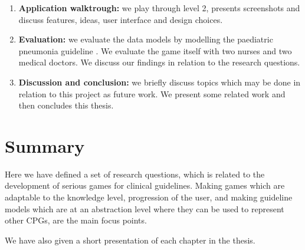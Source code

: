\begin{enumerate}
	\item \textbf{Application walktrough:} we play through level 2, presents screenshots and discuss features, ideas, user interface and design choices.
	\item \textbf{Evaluation:} we evaluate the data models by modelling the paediatric pneumonia guideline \parencite{RepublicofKeny2016}. We evaluate the game itself with two nurses and two medical doctors. We discuss our findings in relation to the research questions.
	\item \textbf{Discussion and conclusion:} we briefly discuss topics which may be done in relation to this project as future work. We present some related work and then concludes this thesis.
\end{enumerate}
\section{Summary}
Here we have defined a set of research questions, which is related to the development of serious games for clinical guidelines. Making games which are adaptable to the knowledge level, progression of the user, and making guideline models which are at an abstraction level where they can be used to represent other CPGs, are the main focus points.

We have also given a short presentation of each chapter in the thesis.


